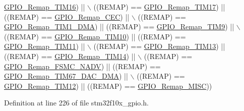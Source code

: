 \begin{DoxyCode}
      \hyperlink{group___g_p_i_o___remap__define_gac9d612f9f9f9f66faecbdbbc29d2ac61}{GPIO\_Remap\_TIM16}) || \(\backslash\)
                              ((REMAP) == \hyperlink{group___g_p_i_o___remap__define_ga9fe98e01f8837d6a1ac4b4833f0fc45e}{GPIO\_Remap\_TIM17}) || ((REMAP) == 
      \hyperlink{group___g_p_i_o___remap__define_gac5961690908d4a0737e82b5a7d271b9b}{GPIO\_Remap\_CEC}) || \(\backslash\)
                              ((REMAP) == \hyperlink{group___g_p_i_o___remap__define_ga255adf908d7d530267707fee39ba2026}{GPIO\_Remap\_TIM1\_DMA}) || ((REMAP) == 
      \hyperlink{group___g_p_i_o___remap__define_gadfed4d88bc9a4093d16ce64a85b6051a}{GPIO\_Remap\_TIM9}) || \(\backslash\)
                              ((REMAP) == \hyperlink{group___g_p_i_o___remap__define_gac94252266a8fcb9ce7b55b5c55464110}{GPIO\_Remap\_TIM10}) || ((REMAP) == 
      \hyperlink{group___g_p_i_o___remap__define_ga0f308f1bb45e4c473766603b4bef47f8}{GPIO\_Remap\_TIM11}) || \(\backslash\)
                              ((REMAP) == \hyperlink{group___g_p_i_o___remap__define_ga72f5da86ed94f3be978cd841f7cd37cb}{GPIO\_Remap\_TIM13}) || ((REMAP) == 
      \hyperlink{group___g_p_i_o___remap__define_gaa2ae554ed69ad3368c2cd7db678b3fd0}{GPIO\_Remap\_TIM14}) || \(\backslash\)
                              ((REMAP) == \hyperlink{group___g_p_i_o___remap__define_ga97088efda8b8a057f4ba58de8f51625f}{GPIO\_Remap\_FSMC\_NADV}) || ((REMAP) == 
      \hyperlink{group___g_p_i_o___remap__define_gae69d46a269c2284c8cc6a90742e89b12}{GPIO\_Remap\_TIM67\_DAC\_DMA}) || \(\backslash\)
                              ((REMAP) == \hyperlink{group___g_p_i_o___remap__define_ga44d3d86a684f62f9142d34ea5975a637}{GPIO\_Remap\_TIM12}) || ((REMAP) == 
      \hyperlink{group___g_p_i_o___remap__define_ga543f3626303b3452528cb622ad088d26}{GPIO\_Remap\_MISC}))
\end{DoxyCode}


Definition at line 226 of file stm32f10x\+\_\+gpio.\+h.

